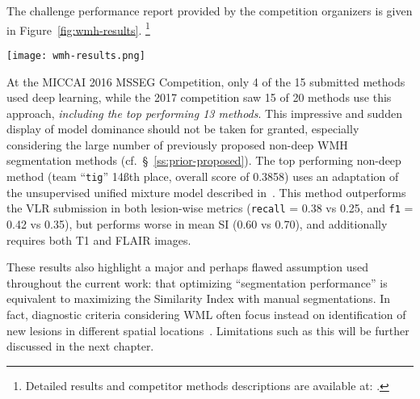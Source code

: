 The challenge performance report provided by the competition organizers
is given in Figure~\ref{fig:wmh-results}.%
\footnote{Detailed results and competitor methods descriptions are available at:
  .}
\par
\begin{sidewaysfigure}
    \centering
    \texttt{[image: wmh-results.png]}\\
    \caption{Results report for the submitted method provided by the WMH Segmentation Competition.}%
    \label{fig:wmh-results}
\end{sidewaysfigure}
At the MICCAI 2016 MSSEG Competition, only 4 of the 15 submitted methods used deep learning,
while the 2017 competition saw 15 of 20 methods use this approach,
\textit{including the top performing 13 methods}.
This impressive and sudden display of model dominance should not be taken for granted,
especially considering the large number of previously proposed non-deep WMH segmentation methods
(cf.~\S~\ref{ss:prior-proposed}).
The top performing non-deep method (team ``\texttt{tig}'' 14\ss{th} place, overall score of 0.3858)
uses an adaptation of the unsupervised unified mixture model described in~\cite{Sudre2015}.
This method outperforms the VLR submission in both lesion-wise metrics
(\texttt{recall} = 0.38 vs 0.25, and \texttt{f1} = 0.42 vs 0.35),
but performs worse in mean SI (0.60 vs 0.70), and additionally requires both T1 and FLAIR images.
\par
These results also highlight a major and perhaps flawed assumption used
throughout the current work:
that optimizing ``segmentation performance'' is equivalent to
maximizing the Similarity Index with manual segmentations.
In fact, diagnostic criteria considering WML often focus instead on
identification of new lesions in different spatial locations~\cite{Polman2011,Sorbi2012}.
Limitations such as this will be further discussed in the next chapter.

